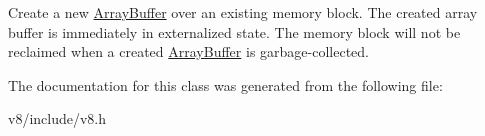Create a new \hyperlink{classv8_1_1ArrayBuffer}{Array\-Buffer} over an existing memory block. The created array buffer is immediately in externalized state. The memory block will not be reclaimed when a created \hyperlink{classv8_1_1ArrayBuffer}{Array\-Buffer} is garbage-\/collected. 

The documentation for this class was generated from the following file\-:\begin{DoxyCompactItemize}
\item 
v8/include/v8.\-h\end{DoxyCompactItemize}
